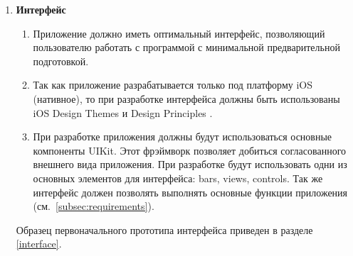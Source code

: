 \renewcommand{\labelenumi}{\textbf{NFR-\arabic{enumi}}.}

\renewcommand{\labelenumii}{\textbf{NFR-\arabic{enumi}.\arabic{enumii}}.}

\renewcommand{\labelenumiii}{\arabic{enumiii}.}
\begin{enumerate}
	\item \textbf{Интерфейс}
	\begin{enumerate}
		\item Приложение должно иметь оптимальный интерфейс, позволяющий пользователю работать с программой с минимальной предварительной подготовкой. 
		\item Так как приложение разрабатывается только под платформу iOS (нативное), то при разработке интерфейса должны быть использованы iOS Design Themes и Design Principles \cite{interface}. 
		\item При разработке приложения должны будут использоваться основные компоненты UIKit\cite{UIKit}. Этот фрэймворк позволяет добиться согласованного внешнего вида приложения. При разработке будут использовать одни из основных элементов для интерфейса: bars, views, controls. Так же интерфейс должен позволять выполнять основные функции приложения (см.~\ref{subsec:requirements}). 
	\end{enumerate}
Образец первоначального прототипа интерфейса приведен в разделе \ref{interface}.
\end{enumerate}
\renewcommand{\labelenumi}{\arabic{enumi}.}

\renewcommand{\labelenumii}{\arabic{enumii}.}

\renewcommand{\labelenumiii}{\arabic{enumiii}.}




